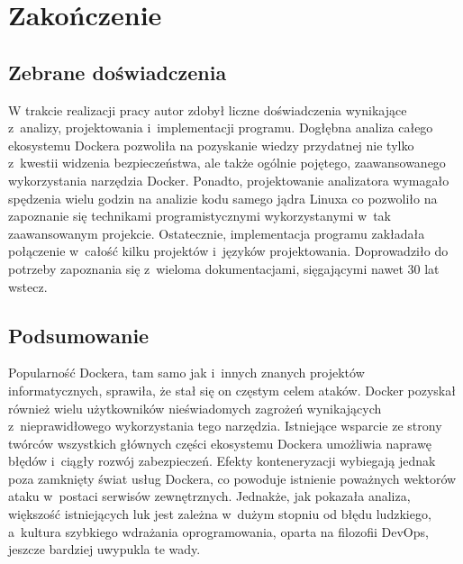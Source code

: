 \chapter{Zakończenie}

\section{Zebrane doświadczenia}

W trakcie realizacji pracy autor zdobył liczne doświadczenia wynikające z~analizy, projektowania i~implementacji programu. Dogłębna analiza całego ekosystemu Dockera pozwoliła na pozyskanie wiedzy przydatnej nie tylko z~kwestii widzenia bezpieczeństwa, ale także ogólnie pojętego, zaawansowanego wykorzystania narzędzia Docker. Ponadto, projektowanie analizatora wymagało spędzenia wielu godzin na analizie kodu samego jądra Linuxa co pozwoliło na zapoznanie się technikami programistycznymi wykorzystanymi w~tak zaawansowanym projekcie. Ostatecznie, implementacja programu zakładała połączenie w~całość kilku projektów i~języków projektowania. Doprowadziło do potrzeby zapoznania się z~wieloma dokumentacjami, sięgającymi nawet 30 lat wstecz.

\section{Podsumowanie}

Popularność Dockera, tam samo jak i~innych znanych projektów informatycznych, sprawiła, że stał się on częstym celem ataków. Docker pozyskał również wielu użytkowników nieświadomych zagrożeń wynikających z~nieprawidłowego wykorzystania tego narzędzia. Istniejące wsparcie ze strony twórców wszystkich głównych części ekosystemu Dockera umożliwia naprawę błędów i~ciągły rozwój zabezpieczeń. Efekty konteneryzacji wybiegają jednak poza zamknięty świat usług Dockera, co powoduje istnienie poważnych wektorów ataku w~postaci serwisów zewnętrznych. Jednakże, jak pokazała analiza, większość istniejących luk jest zależna w~dużym stopniu od błędu ludzkiego, a~kultura szybkiego wdrażania oprogramowania, oparta na filozofii DevOps, jeszcze bardziej uwypukla te wady.
